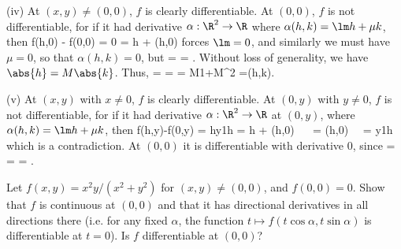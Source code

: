 \begin{solution}[\bf Solution.]
\item [(iv)] At $(x,y)\neq (0,0)$, $f$ is clearly differentiable. At $(0,0)$, $f$ is not differentiable, for if it had derivative $\alpha:\R^2\to \R$ where $\alpha(h,k)=\lm h + \mu k$, then
\be
f(h,0) - f(0,0) = 0 = \lm h + \epsilon(h,0)
\ee
forces $\lm = 0$, and similarly we must have $\mu = 0$, so that $\alpha(h,k)=0$, but
\be
{} =  = .
\ee
Without loss of generality, we have $\abs{h}= M\abs{k}$. Thus,
\be
{} =  =  = \frac M{1+M^2} =\alpha(h,k).
\ee
\item [(v)] At $(x,y)$ with $x\neq 0$, $f$ is clearly differentiable. At $(0,y)$ with $y \neq 0$, $f$ is not differentiable, for if it had derivative $\alpha:\R^2\to\R$ at $(0,y)$, where $\alpha(h,k)= \lm h + \mu k$, then
\be
f(h,y)-f(0,y) = hy\sin \tfrac 1h = \lm h + \epsilon(h,0) \ \ra \  = \epsilon(h,0) \ \ra \ \lm = y\sin\tfrac 1h
\ee
which is a contradiction. At $(0,0)$ it is differentiable with derivative 0, since
\be
{} =  \leq {} =  \leq {}  =   .
\ee
\een



\end{solution}

\begin{problem}Let $f(x, y) = x^2y/(x^2 + y^2)$ for $(x, y) \neq (0, 0)$, and $f(0, 0) = 0$. Show that $f$ is continuous at $(0, 0)$ and that it has directional derivatives in all directions there (i.e. for any fixed $\alpha$, the function $t \mapsto f(t \cos \alpha, t \sin \alpha )$ is differentiable at $t = 0$). Is $f$ differentiable at $(0, 0)$?



\end{problem}

